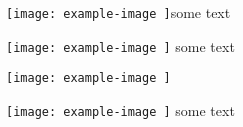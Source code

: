 \texttt{[image: example-image
]}some text

\texttt{[image: example-image
]} some text

\texttt{[image: example-image
]} %

\texttt{[image: example-image
]}  some text

